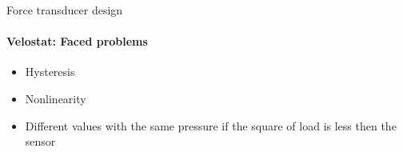 \documentclass[aspectratio=169,xcolor=table]{beamer}
\begin{document}
\begin{frame}[t]{Force transducer design}
    \framesubtitle{Velostat: Faced problems}
    \vspace{-20pt}
    \begin{multicols}{2}
        {\large
            \begin{itemize}
                \item Hysteresis
                \item Nonlinearity
                \item Different values with the same pressure if the square of load is less then the sensor
            \end{itemize}}
            \begin{figure}[H]
                \centering
\end{figure}
\end{multicols}
\end{frame}
\end{document}

